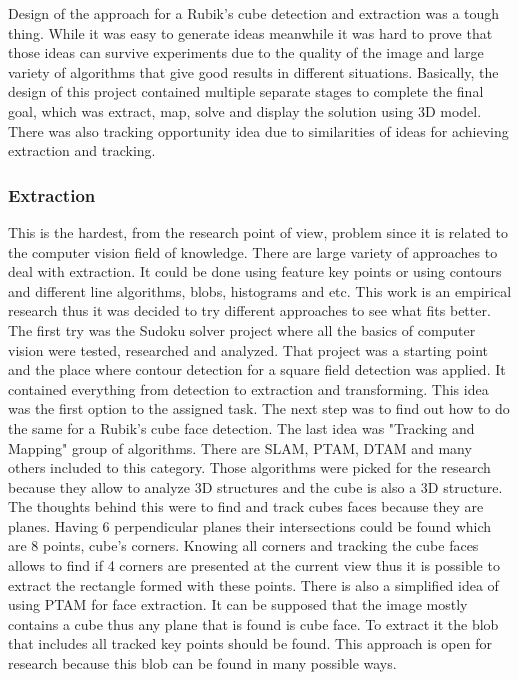 \documentclass[../../main.tex]{subfiles}
\begin{document}
Design of the approach for a Rubik's cube detection and extraction was a tough thing. While it was easy to generate ideas meanwhile it was hard to prove that those ideas can survive experiments due to the quality of the image and large variety of algorithms that give good results in different situations. Basically, the design of this project contained multiple separate stages to complete the final goal, which was extract, map, solve and display the solution using 3D model. There was also tracking opportunity idea due to similarities of ideas for achieving extraction and tracking.

\subsubsection*{Extraction}

This is the hardest, from the research point of view, problem since it is related to the computer vision field of knowledge. There are large variety of approaches to deal with extraction. It could be done using feature key points or using contours and different line algorithms, blobs, histograms and etc. This work is an empirical research thus it was decided to try different approaches to see what fits better. The first try was the Sudoku solver project where all the basics of computer vision were tested, researched and analyzed. That project was a starting point and the place where contour detection for a square field detection was applied. It contained everything from detection to extraction and transforming. This idea was the first option to the assigned task. The next step was to find out how to do the same for a Rubik's cube face detection. The last idea was "Tracking and Mapping" group of algorithms. There are \ac{SLAM}, \ac{PTAM}, \ac{DTAM} and many others included to this category. Those algorithms were picked for the research because they allow to analyze 3D structures and the cube is also a 3D structure. The thoughts behind this were to find and track cubes faces because they are planes. Having 6 perpendicular planes their intersections could be found which are 8 points, cube's corners. Knowing all corners and tracking the cube faces allows to find if 4 corners are presented at the current view thus it is possible to extract the rectangle formed with these points.
There is also a simplified idea of using \ac{PTAM} for face extraction. It can be supposed that the image mostly contains a cube thus any plane that is found is cube face. To extract it the blob that includes all tracked key points should be found. This approach is open for research because this blob can be found in many possible ways.
\end{document}
